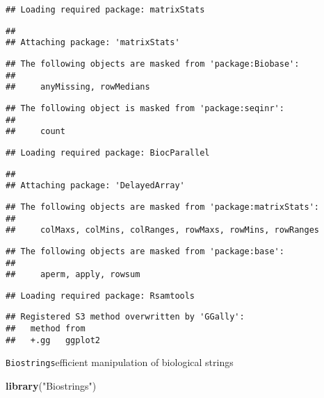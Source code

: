 \documentclass[]{article}
\newenvironment{Shaded}{\begin{snugshade}}{\end{snugshade}}
\newcommand{\KeywordTok}[1]{\textcolor[rgb]{0.13,0.29,0.53}{\textbf{#1}}}
\newcommand{\NormalTok}[1]{#1}
\newcommand{\StringTok}[1]{\textcolor[rgb]{0.31,0.60,0.02}{#1}}
\begin{document}
\begin{verbatim}
## Loading required package: matrixStats
\end{verbatim}

\begin{verbatim}
## 
## Attaching package: 'matrixStats'
\end{verbatim}

\begin{verbatim}
## The following objects are masked from 'package:Biobase':
## 
##     anyMissing, rowMedians
\end{verbatim}

\begin{verbatim}
## The following object is masked from 'package:seqinr':
## 
##     count
\end{verbatim}

\begin{verbatim}
## Loading required package: BiocParallel
\end{verbatim}

\begin{verbatim}
## 
## Attaching package: 'DelayedArray'
\end{verbatim}

\begin{verbatim}
## The following objects are masked from 'package:matrixStats':
## 
##     colMaxs, colMins, colRanges, rowMaxs, rowMins, rowRanges
\end{verbatim}

\begin{verbatim}
## The following objects are masked from 'package:base':
## 
##     aperm, apply, rowsum
\end{verbatim}

\begin{verbatim}
## Loading required package: Rsamtools
\end{verbatim}

\begin{verbatim}
## Registered S3 method overwritten by 'GGally':
##   method from   
##   +.gg   ggplot2
\end{verbatim}

\texttt{Biostrings}efficient manipulation of biological strings

\begin{Shaded}
\begin{Highlighting}[]
\KeywordTok{library}\NormalTok{(}\StringTok{"Biostrings"}\NormalTok{)}
\end{Highlighting}
\end{Shaded}
\end{document}
